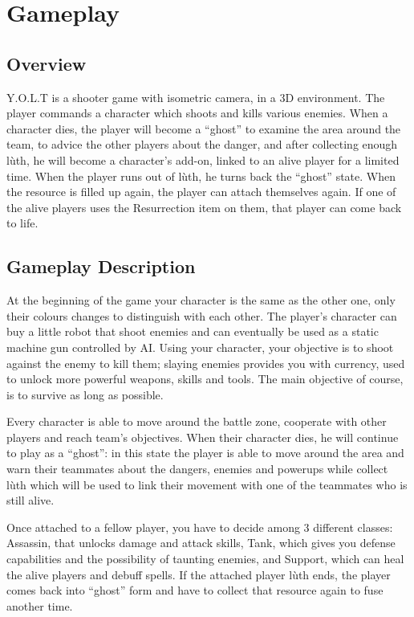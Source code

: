 \documentclass[12pt]{article}
\begin{document}
\newpage

\section{Gameplay}

\subsection{Overview}

Y.O.L.T is a shooter game with isometric camera, in a 3D environment. The player commands a character which shoots and kills various enemies. When a character dies, the player will become a “ghost” to examine the area around the team, to advice the other players about the danger, and after collecting enough lùth, he will become a character’s add-on, linked to an alive player for a limited time. When the player runs out of lùth, he turns back the “ghost” state. When the resource is filled up again, the player can attach themselves again. If one of the alive players uses the Resurrection item on them, that player can come back to life.

\subsection{Gameplay Description}

At the beginning of the game your character is the same as the other one, only their colours changes to distinguish with each other. The player’s character can buy a little robot that shoot enemies and can eventually be used as a static machine gun controlled by AI. Using your character, your objective is to shoot against the enemy to kill them; slaying enemies provides you with currency, used to unlock more powerful weapons, skills and tools. The main objective of course, is to survive as long as possible.

Every character is able to move around the battle zone, cooperate with other players and reach team’s objectives. When their character dies, he will continue to play as a “ghost”: in this state the player is able to move around the area and warn their teammates about the dangers, enemies and powerups while collect lùth which will be used to link their movement with one of the teammates who is still alive.

Once attached to a fellow player, you have to decide among 3 different classes: Assassin, that unlocks damage and attack skills, Tank, which gives you defense capabilities and the possibility of taunting enemies, and Support, which can heal the alive players and debuff spells. If the attached player lùth ends, the player comes back into “ghost” form and have to collect that resource again to fuse another time.
\end{document}
